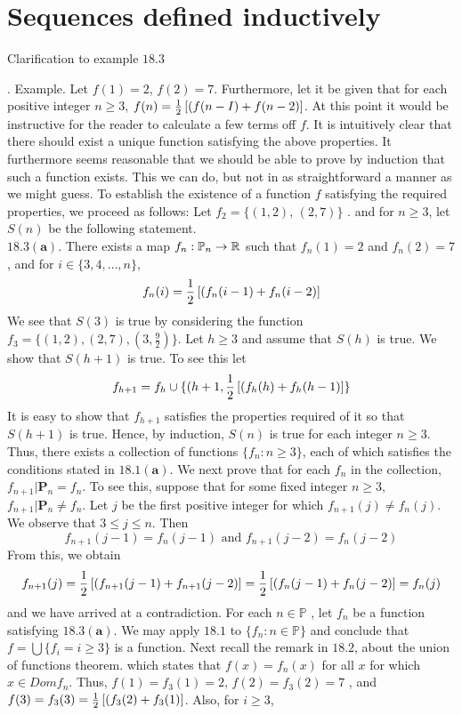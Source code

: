 \newpage

 \section{Sequences defined inductively}
\begin{tcolorbox}
Clarification to example $\mathbf{18.3} $
\end{tcolorbox}
$$ $$
. Example. Let $f(1)=2$, $f(2)= 7$. Furthermore, let it be given that for each positive integer $n\ge  3$, $f(n)=\frac{1}{2}\left[(f(n-I)+ f(n-2)\right]$. At this point it would be instructive for the reader to calculate a few terms off $f$. It is intuitively clear that there should exist a unique function satisfying the above properties. It furthermore seems reasonable that we should be able to prove by induction that such a function exists. This we can do, but not in as straightforward a manner as we might guess. To establish the existence of a function $f$ satisfying the required properties, we proceed as follows: Let $f_2 =\{(1,2),\, (2,7)\}$ . and for $n\ge 3$, let $S(n)$ be the following statement.\\
 $\mathbf{ 18.3(a)}$. There exists a map $f_n:\mathbb{P}_n\rightarrow \mathbb{R}$ such that $f_n(1) = 2$ and $f_n(2)=7$ , and for $i\in \{3,4,\dots , n\}$, 
 $$f_n(i)=\frac{1}{2}\left[(f_n(i-1)+ f_n(i-2)\right]$$ We see that $S(3)$ is true by considering the function $f_3=\{(1,2),(2, 7), (3, \frac{9}{2})\}$. Let $h \ge 3$ and assume that $S(h)$ is true. We show that $S(h +1)$ is true. To see this 
let 
$$f_{h+1} =f_h\cup \{(h+1,  \frac{1}{2}\left[(f_h(h)+ f_h(h-1)\right]\}$$ It is easy to show that $f_{h+1}$ satisfies the properties required of it so that $S(h+1)$ is true. Hence, by induction, $S(n)$ is true for each integer $n \ge 3$. Thus, there exists a collection of functions $\{f_n:n\ge3\}$, each of which satisfies the conditions stated in $\mathbf{18.1(a)}$. We next prove that for each $f_n$ in the collection, $f_{n+1}|\mathbf{P}_n=f_n$. To see this, suppose that for some fixed integer $n\ge 3$, $f_{n+1}|\mathbf{P}_n\ne f_n$. Let $j$ be the first positive integer for which $f_{n+1}(j)\ne f_n(j)$. We observe that $3 \le j \le n$. Then
$$f_{n+1}(j-1)= f_n(j-1) \text{ and  } f_{n+1}(j-2)= f_n(j-2)$$ 
From this, we obtain 
$$f_{n+1}(j)= \frac{1}{2}\left[(f_{n+1}(j-1)+ f_{n+1}(j-2)\right] = \frac{1}{2}\left[(f_{n}(j-1)+ f_{n}(j-2)\right]=f_n(j)$$ and we have arrived at a contradiction. For each $n \in \mathbb{ P}$ , let $f_n$  be a function satisfying $\mathbf{18.3(a)}$. We may apply $\mathbf{18.1}$ to $\{f_n:n\in\mathbb{P}\}$ and conclude that $f=\bigcup\{f_i=i\ge3\}$  is a function. Next recall the remark in $\mathbf{18.2}$, about the union of functions theorem. which states that $f(x)=f_n(x)$ for all $x$ for which $x \in  Dom f_n$. Thus, $f(1)= f_3(1)= 2,\, f(2)= f_3(2)= 7$ , and $f(3)= f_3(3)=\frac{1}{2}\left[(f_{3}(2)+ f_{3}(1)\right]$. Also, for $i\ge 3$,
